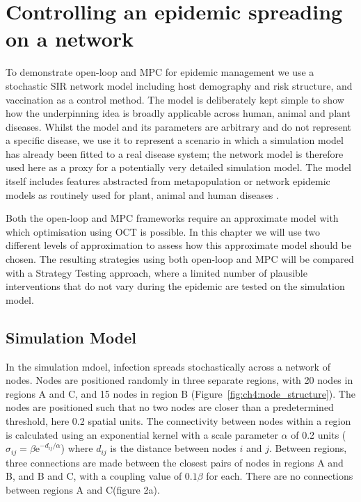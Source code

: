 \section{Controlling an epidemic spreading on a network}
\label{sec:ch4:Controlling}

To demonstrate open-loop and MPC for epidemic management we use a stochastic SIR network model including host demography and risk structure, and vaccination as a control method. The model is deliberately kept simple to show how the underpinning idea is broadly applicable across human, animal and plant diseases. Whilst the model and its parameters are arbitrary and do not represent a specific disease, we use it to represent a scenario in which a simulation model has already been fitted to a real disease system; the network model is therefore used here as a proxy for a potentially very detailed simulation model. The model itself includes features abstracted from metapopulation or network epidemic models as routinely used for plant, animal and human diseases \cite{rowthorn_optimal_2009, keeling_dynamics_2001, keeling_metapopulation_2000, margosian_connectivity_2009, bansal_individual_2007}.

Both the open-loop and MPC frameworks require an approximate model with which optimisation using OCT is possible. In this chapter we will use two different levels of approximation to assess how this approximate model should be chosen. The resulting strategies using both open-loop and MPC will be compared with a Strategy Testing approach, where a limited number of plausible interventions that do not vary during the epidemic are tested on the simulation model. 

\subsection{Simulation Model}

In the simulation mdoel, infection spreads stochastically across a network of nodes. Nodes are positioned randomly in three separate regions, with 20 nodes in regions A and C, and 15 nodes in region B (Figure~\ref{fig:ch4:node_structure}). The nodes are positioned such that no two nodes are closer than a predetermined threshold, here 0.2 spatial units. The connectivity between nodes within a region is calculated using an exponential kernel with a scale parameter $\alpha$ of 0.2 units ($\sigma_{ij} = \beta\mathrm{e}^{-d_{ij}/\alpha}$) where $d_{ij}$ is the distance between nodes $i$ and $j$. Between regions, three connections are made between the closest pairs of nodes in regions A and B, and B and C, with a coupling value of $0.1\beta$ for each. There are no connections between regions A and C(figure 2a).

